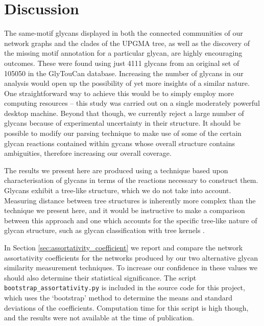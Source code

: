 \documentclass[12pt,a4paper]{article}
\begin{document}
\newpage
\section{Discussion}
\label{sec:discussion}

The same-motif glycans displayed in both the connected communities of  our network graphs and the clades of the UPGMA tree, as well as the discovery of the missing motif annotation for a particular glycan, are highly encouraging outcomes. These were found using just 4111 glycans from an original set of 105050 in the GlyTouCan database. Increasing the number of glycans in our analysis would open up the possibility of yet more insights of a similar nature. One straightforward way to achieve this would be to simply employ more computing resources -- this study was carried out on a single moderately powerful desktop machine. Beyond that though, we currently reject a large number of glycans because of experimental uncertainty in their structure. It should be possible to modify our parsing technique to make use of some of the certain glycan reactions contained within gycans whose overall structure contains ambiguities, therefore increasing our overall coverage.

The results we present here are produced using a technique based upon characterisation of glycans in terms of the reactions necessary to construct them. Glycans exhibit a tree-like structure, which we do not take into account. Measuring distance between tree structures is inherently more complex than the technique we present here, and it would be instructive to make a comparison between this approach and one which accounts for the specific tree-like nature of glycan structure, such as glycan classification with tree kernels \citep{doi:10.1093/bioinformatics/btm090}.

In Section \ref{sec:assortativity_coefficient} we report and compare the network assortativity coefficients for the networks produced by our two alternative glycan similarity measurement techniques. To increase our confidence in these values we should also determine their statistical significance. The script \texttt{bootstrap\_assortativity.py} is included in the source code for this project, which uses the `bootstrap' \citep{efron1992bootstrap} method to determine the means and standard deviations of the coefficients. Computation time for this script is high though, and the results were not available at the time of publication.



\newpage
\end{document}
